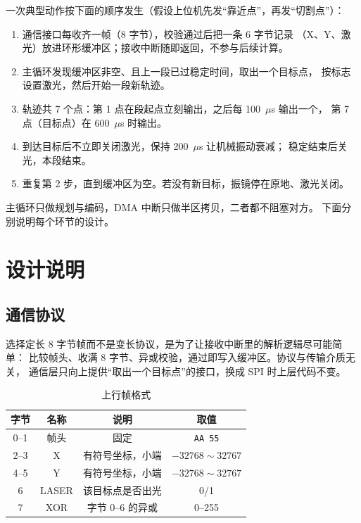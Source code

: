 \documentclass[UTF8,a4paper,11pt]{ctexart}
\begin{document}
一次典型动作按下面的顺序发生（假设上位机先发“靠近点”，再发“切割点”）：

\begin{enumerate}
  \item 通信接口每收齐一帧（8 字节），校验通过后把一条 6 字节记录
        （X、Y、激光）放进环形缓冲区；接收中断随即返回，不参与后续计算。
  \item 主循环发现缓冲区非空、且上一段已过稳定时间，取出一个目标点，
        按标志设置激光，然后开始一段新轨迹。
  \item 轨迹共 7 个点：第 1 点在段起点立刻输出，之后每 100~$\mu$s 输出一个，
        第 7 点（目标点）在 600~$\mu$s 时输出。
  \item 到达目标后不立即关闭激光，保持 200~$\mu$s 让机械振动衰减；
        稳定结束后关光，本段结束。
  \item 重复第 2 步，直到缓冲区为空。若没有新目标，振镜停在原地、激光关闭。
\end{enumerate}

主循环只做规划与编码，DMA 中断只做半区拷贝，二者都不阻塞对方。
下面分别说明每个环节的设计。

\section{设计说明}

\subsection{通信协议}

选择定长 8 字节帧而不是变长协议，是为了让接收中断里的解析逻辑尽可能简单：
比较帧头、收满 8 字节、异或校验，通过即写入缓冲区。协议与传输介质无关，
通信层只向上提供“取出一个目标点”的接口，换成 SPI 时上层代码不变。

\begin{table}[htbp]
\centering
\caption{上行帧格式}
\begin{tabular}{@{}cccc@{}}
\toprule
字节 & 名称 & 说明 & 取值 \\
\midrule
0--1 & 帧头 & 固定 & \texttt{AA 55} \\
2--3 & X & 有符号坐标，小端 & $-32768\sim32767$ \\
4--5 & Y & 有符号坐标，小端 & $-32768\sim32767$ \\
6    & LASER & 该目标点是否出光 & 0/1 \\
7    & XOR & 字节 0--6 的异或 & 0--255 \\
\bottomrule
\end{tabular}
\end{table}
\end{document}
